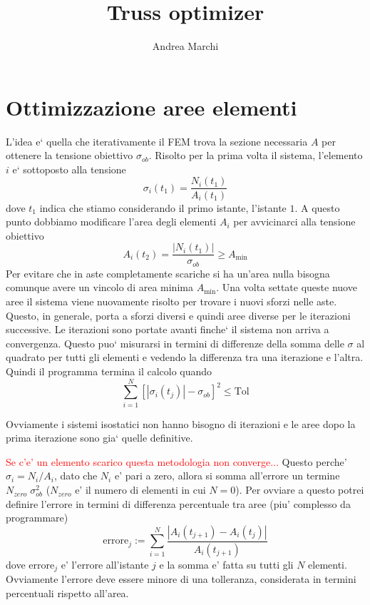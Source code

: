 \documentclass[]{article}
\begin{document}
\title{\Huge \bfseries Truss optimizer}
\author{Andrea Marchi}
\maketitle


\section{Ottimizzazione aree elementi}

L'idea e` quella che iterativamente il FEM trova la sezione necessaria $A$ per ottenere la tensione obiettivo $\sigma_{ob}$.
Risolto per la prima volta il sistema, l'elemento $i$ e` sottoposto alla tensione
$$ \sigma_i(t_1) = \frac{N_i(t_1)}{A_i(t_1)} $$
dove $t_1$ indica che stiamo considerando il primo istante, l'istante $1$.
A questo punto dobbiamo modificare l'area degli elementi $A_i$ per avvicinarci alla tensione obiettivo
$$ A_i(t_2) = \frac{|N_i(t_1)|}{\sigma_{ob}} \geq A_{\min} $$
Per evitare che in aste completamente scariche si ha un'area nulla bisogna comunque avere un vincolo di area minima $A_{\min}$.
Una volta settate queste nuove aree il sistema viene nuovamente risolto per trovare i nuovi sforzi nelle aste. Questo, in generale, porta a sforzi diversi e quindi aree diverse per le iterazioni successive.
Le iterazioni sono portate avanti finche` il sistema non arriva a convergenza. Questo puo` misurarsi in termini di differenze della somma delle $\sigma$ al quadrato per tutti gli elementi e vedendo la differenza tra una iterazione e l'altra. Quindi il programma termina il calcolo quando
$$ \sum_{i=1}^N \left[|\sigma_i(t_j)| - \sigma_{ob} \right]^2 \leq \mathrm{Tol} $$

Ovviamente i sistemi isostatici non hanno bisogno di iterazioni e le aree dopo la prima iterazione sono gia` quelle definitive.

\textcolor{red}{Se c'e' un elemento scarico questa metodologia non converge...}
Questo perche' $\sigma_i = N_i / A_i$, dato che $N_i$ e' pari a zero, allora si somma all'errore un termine $N_{zero} \; \sigma_{ob}^2$ ($N_{zero}$ e' il numero di elementi in cui $N=0$).
Per ovviare a questo potrei definire l'errore in termini di differenza percentuale tra aree (piu' complesso da programmare)
$$ \mathrm{errore}_j := \sum_{i=1}^N \frac{|A_i(t_{j+1}) - A_i(t_j)|}{A_i(t_{j+1})} $$
dove $\mathrm{errore}_j$ e' l'errore all'istante $j$ e la somma e' fatta su tutti gli $N$ elementi.
Ovviamente l'errore deve essere minore di una tolleranza, considerata in termini percentuali rispetto all'area.
\end{document}
